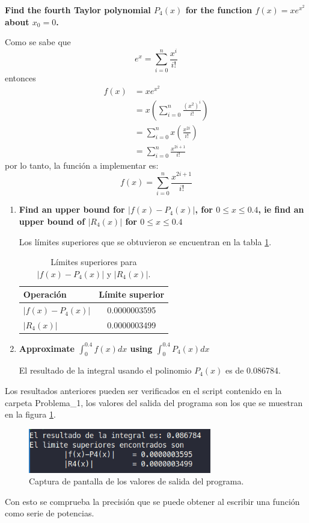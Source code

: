 \item \textbf{Find the fourth Taylor polynomial $P_4(x)$ for the function $f (x) = xe^{x^2}$ about $x_0 = 0$.}

Como se sabe que
\begin{equation*}
    e^x= \sum_{i=0}^n \frac{x^i}{i!}
\end{equation*}
entonces
\begin{align*}
    f(x) & =xe^{x^2}                                       \\
         & =x \left(\sum_{i=0}^n \frac{(x^2)^i}{i!}\right) \\
         & =  \sum_{i=0}^n x\left(\frac{x^{2i}}{i!}\right) \\
         & = \sum_{i=0}^n \frac{x^{2i+1}}{i!}
\end{align*}
por lo tanto, la función a implementar es:
\begin{equation*}
    f(x)= \sum_{i=0}^n \frac{x^{2i+1}}{i!}
\end{equation*}
\begin{enumerate}
    \item \textbf{Find an upper bound for $|f (x)-P_4 (x)|$, for $0 \leq x \leq 0.4$, ie find an upper bound of $|R_4 (x)|$ for $0 \leq x \leq 0.4$}

          Los límites superiores que se obtuvieron se encuentran en la tabla \ref{table:problema1}.
          \begin{table}[H]
              \centering
              \begin{tabular}{lc} \hline
                  \textbf{Operación} & \textbf{Límite superior} \\ \hline
                  $|f(x)-P_4(x)|$    & 0.0000003595             \\
                  $|R_4(x)|$         & 0.0000003499             \\ \hline
              \end{tabular}
              \caption{Límites superiores para $|f(x)-P_4(x)|$ y $|R_4(x)|$.}
              \label{table:problema1}
          \end{table}
    \item \textbf{Approximate $\int_0^{0.4} f(x)dx$ using $\int_0^{0.4} P_4(x)dx$}

          El resultado de la integral usando el polinomio $P_4(x)$ es de 0.086784.
\end{enumerate}
Los resultados anteriores pueden ser verificados en el script contenido en la carpeta \textcolor{citecolor}{Problema\_1}, los valores del salida del programa son los que se muestran en la figura \ref{fig:problema1ss}.
\begin{figure}[H]
    \centering
    \includegraphics[width=8cm]{Graphics/problema1_ss.png}
    \caption{Captura de pantalla de los valores de salida del programa.}
    \label{fig:problema1ss}
\end{figure}
Con esto se comprueba la precisión que se puede obtener al escribir una función como serie de potencias.